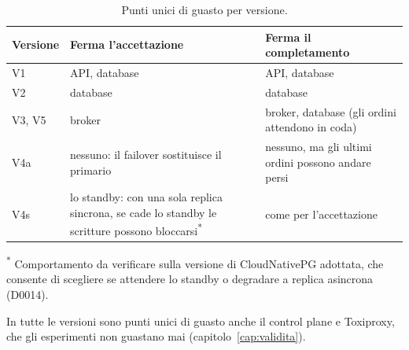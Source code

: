 \begin{table}[htbp]
\centering
\caption{Punti unici di guasto per versione.}
\label{tab:spof}
\begin{tabularx}{\linewidth}{@{}lLL@{}}
\toprule
\textbf{Versione} & \textbf{Ferma l'accettazione} & \textbf{Ferma il completamento} \\
\midrule
V1 & API, database & API, database \\
V2 & database & database \\
V3, V5 & broker & broker, database (gli ordini attendono in coda) \\
V4a & nessuno: il failover sostituisce il primario & nessuno, ma gli ultimi ordini possono andare persi \\
V4s & lo standby: con una sola replica sincrona, se cade lo standby le scritture possono bloccarsi\textsuperscript{*} & come per l'accettazione \\
\bottomrule
\end{tabularx}

\vspace{2pt}
{\footnotesize\textsuperscript{*} Comportamento da verificare sulla versione di CloudNativePG adottata, che consente di scegliere se attendere lo standby o degradare a replica asincrona (D0014).\par}
{\footnotesize In tutte le versioni sono punti unici di guasto anche il control plane e Toxiproxy, che gli esperimenti non guastano mai (capitolo~\ref{cap:validita}).\par}
\end{table}

